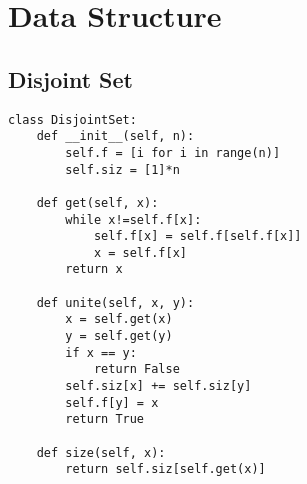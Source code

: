 \documentclass[landscape, 8pt, a4paper, oneside, twocolumn]{extarticle}
\begin{document}
\section{Data Structure}
\subsection{Disjoint Set}
\begin{verbatim}
class DisjointSet:
    def __init__(self, n):
        self.f = [i for i in range(n)]
        self.siz = [1]*n

    def get(self, x):
        while x!=self.f[x]:
            self.f[x] = self.f[self.f[x]]
            x = self.f[x]
        return x

    def unite(self, x, y):
        x = self.get(x)
        y = self.get(y)
        if x == y:
            return False
        self.siz[x] += self.siz[y]
        self.f[y] = x
        return True

    def size(self, x):
        return self.siz[self.get(x)]

\end{verbatim}
\end{document}
